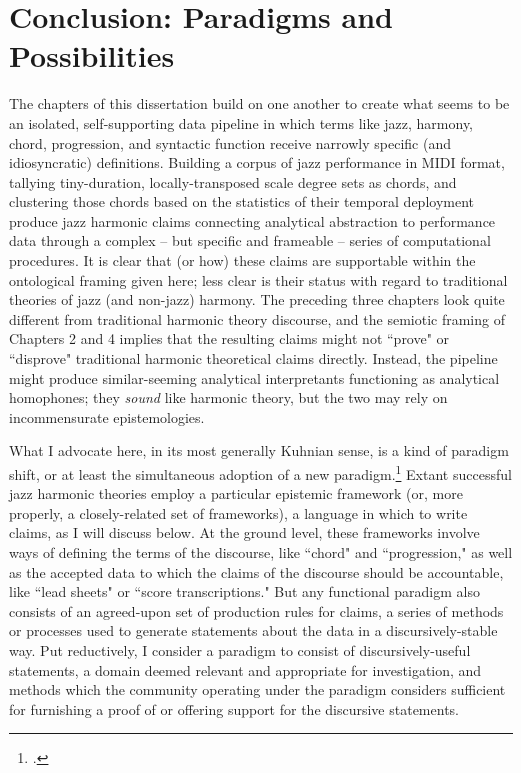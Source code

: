 \chapter{Conclusion: Paradigms and Possibilities}


The chapters of this dissertation build on one another to create what seems to be an isolated, self-supporting data pipeline in which terms like jazz, harmony, chord, progression, and syntactic function receive narrowly specific (and idiosyncratic) definitions.  Building a corpus of jazz performance in MIDI format, tallying tiny-duration, locally-transposed scale degree sets as chords, and clustering those chords based on the statistics of their temporal deployment produce jazz harmonic claims connecting analytical abstraction to performance data through a complex -- but specific and frameable -- series of computational procedures.  It is clear that (or how) these claims are supportable within the ontological framing given here; less clear is their status with regard to traditional theories of jazz (and non-jazz) harmony.  The preceding three chapters look quite different from traditional harmonic theory discourse, and the semiotic framing of Chapters 2 and 4 implies that the resulting claims might not ``prove" or ``disprove" traditional harmonic theoretical claims directly.  Instead, the pipeline might produce similar-seeming analytical interpretants functioning as analytical homophones; they \emph{sound} like harmonic theory, but the two may rely on incommensurate epistemologies.

What I advocate here, in its most generally Kuhnian sense, is a kind of paradigm shift, or at least the simultaneous adoption of a new paradigm.\footnote{\cite{kuhn1962}.}  Extant successful jazz harmonic theories employ a particular epistemic framework (or, more properly, a closely-related set of frameworks), a language in which to write claims, as I will discuss below.  At the ground level, these frameworks involve ways of defining the terms of the discourse, like ``chord" and ``progression," as well as the accepted data to which the claims of the discourse should be accountable, like ``lead sheets" or ``score transcriptions."  But any functional paradigm also consists of an agreed-upon set of production rules for claims, a series of methods or processes used to generate statements about the data in a discursively-stable way.  Put reductively, I consider a paradigm to consist of discursively-useful statements, a domain deemed relevant and appropriate for investigation, and methods which the community operating under the paradigm considers sufficient for furnishing a proof of or offering support for the discursive statements.

